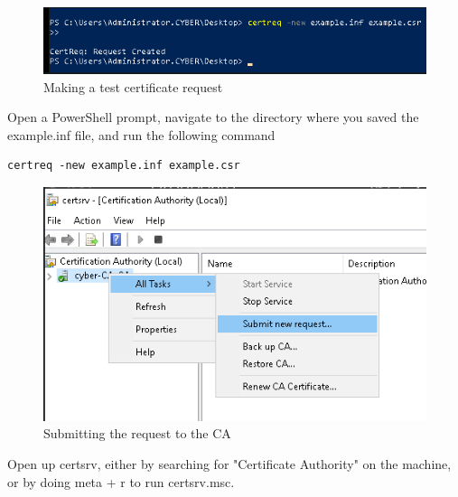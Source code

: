 \documentclass{article}
\begin{document}
\begin{figure}[H]
        \centering
        \includegraphics[width=1\textwidth]{MakingATestCertReq.png}
        \caption{Making a test certificate request}
        \label{fig:MakingATestCertReq}
\end{figure}

Open a PowerShell prompt, navigate to the directory where you saved the example.inf file, 
and run the following command
\begin{lstlisting}[breaklines=true, columns=fullflexible]
certreq -new example.inf example.csr
\end{lstlisting}

\begin{figure}[H]
        \centering
        \includegraphics[width=1\textwidth]{SubmitNewRequest.png}
        \caption{Submitting the request to the CA}
        \label{fig:SubmitNewRequest}
\end{figure}

Open up certsrv, either by searching for "Certificate Authority" on the machine,
or by doing meta + r to run certsrv.msc.
\end{document}
